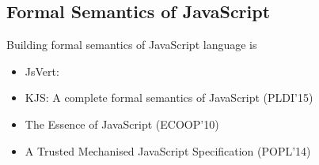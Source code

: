 \subsection{Formal Semantics of JavaScript}
Building formal semantics of JavaScript language is 
\begin{itemize}
  \item JsVert: \cite{javert}
  \item KJS: A complete formal semantics of JavaScript (PLDI'15)~\cite{kjs}
  \item The Essence of JavaScript (ECOOP'10)~\cite{lambdajs}
  \item A Trusted Mechanised JavaScript Specification (POPL'14)~\cite{jscert}
\end{itemize}
